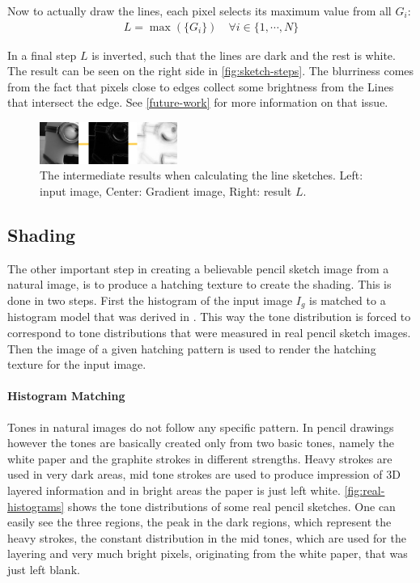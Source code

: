 Now to actually draw the lines, each pixel selects its maximum value from all
$G_i$:
\begin{align}
 L = \max(\lbrace G_i\rbrace) \quad \forall i \in  \lbrace1,\cdots,N\rbrace
 \label{eq:L}
\end{align}

In a final step $L$ is inverted, such that the lines are dark and the rest is
white. The result can be seen on the right side in \autoref{fig:sketch-steps}.
The blurriness comes from the fact that pixels close to edges collect some
brightness from the Lines that intersect the edge. See \autoref{future-work} for
more information on that issue.

\begin{figure}[htb]
  \centering
  \includegraphics[width=0.4\textwidth]{images/sketch-steps.png}
  \caption{The intermediate results when calculating the line sketches. Left:
  input image, Center: Gradient image, Right: result $L$.}
  \label{fig:sketch-steps}
\end{figure}

\subsection{Shading}
The other important step in creating a believable pencil sketch image from a
natural image, is to produce a hatching texture to create the shading. This is
done in two steps. First the histogram of the input image $I_g$ is matched to a
histogram model that was derived in \cite{mainPaper}. This way the tone
distribution is forced to correspond to tone distributions that were measured in
real pencil sketch images. Then the image of a given hatching pattern is used to
render the hatching texture for the input image. 

\paragraph{Histogram Matching}
Tones in natural images do not follow any specific pattern. In pencil drawings
however the tones are basically created only from two basic tones, namely the
white paper and the graphite strokes in different strengths. Heavy strokes are
used in very dark areas, mid tone strokes are used to produce impression of 3D
layered information and in bright areas the paper is just left white.
\autoref{fig:real-histograms} shows the tone distributions of some real pencil
sketches. One can easily see the three regions, the peak in the dark regions,
which represent the heavy strokes, the constant distribution in the mid tones,
which are used for the layering and very much bright pixels, originating from
the white paper, that was just left blank.

